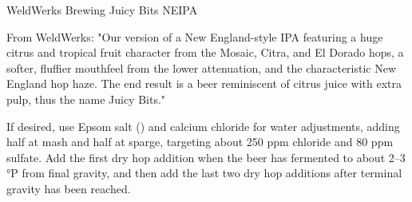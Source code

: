 \begin{recipie}{WeldWerks Brewing Juicy Bits NEIPA}

\begin{aboutblock}
From WeldWerks: "Our version of a New England-style IPA featuring a huge citrus and tropical
fruit character from the Mosaic, Citra, and El Dorado hops, a softer, fluffier mouthfeel from
the lower attenuation, and the characteristic New England hop haze. The end result is a beer
reminiscent of citrus juice with extra pulp, thus the name Juicy Bits."
\end{aboutblock}


\begin{methodandtiming}
 
\begin{mashsteps}
\end{mashsteps}

\begin{fermentationsteps}
\end{fermentationsteps}

\begin{directions}
If desired, use Epsom salt () and calcium chloride for water adjustments, adding
half at mash and half at sparge, targeting about 250 ppm chloride and 80 ppm sulfate.
Add the first dry hop addition when the beer has fermented to about 2--3 °P from final gravity,
and then add the last two dry hop additions after terminal gravity has been reached.
\end{directions}

\end{methodandtiming}

\pagebreak

\begin{ingredientsblock}

\begin{malts}
\end{malts}


\end{ingredientsblock}
\end{recipie}
